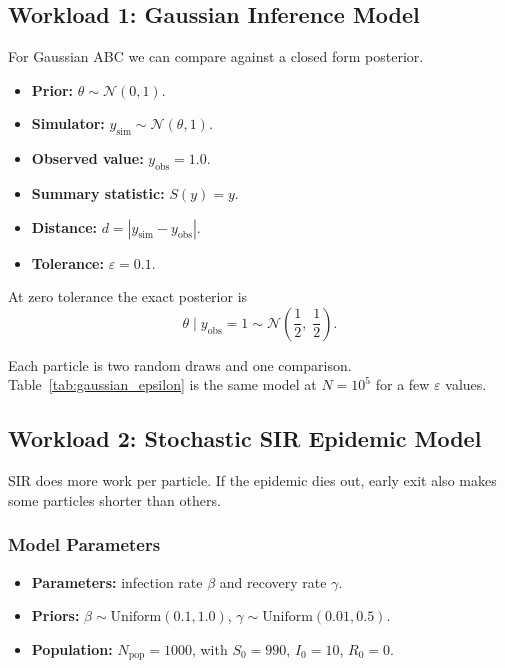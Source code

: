 \documentclass[conference]{IEEEtran}
\begin{document}
\subsection{Workload 1: Gaussian Inference Model}

For Gaussian ABC we can compare against a closed form posterior.

\begin{itemize}
    \item \textbf{Prior:} $\theta \sim \mathcal{N}(0, 1)$.
    \item \textbf{Simulator:} $y_{\mathrm{sim}} \sim \mathcal{N}(\theta, 1)$.
    \item \textbf{Observed value:} $y_{\mathrm{obs}} = 1.0$.
    \item \textbf{Summary statistic:} $S(y) = y$.
    \item \textbf{Distance:}
          $d = |y_{\mathrm{sim}} - y_{\mathrm{obs}}|$.
    \item \textbf{Tolerance:} $\varepsilon = 0.1$.
\end{itemize}

At zero tolerance the exact posterior is
\begin{equation}
    \theta \mid y_{\mathrm{obs}} = 1 \sim
    \mathcal{N}\!\left(\frac{1}{2},\; \frac{1}{2}\right).
    \label{eq:gaussian_posterior}
\end{equation}

Each particle is two random draws and one comparison. Table~\ref{tab:gaussian_epsilon}
is the same model at $N=10^5$ for a few $\varepsilon$ values.

\subsection{Workload 2: Stochastic SIR Epidemic Model}

SIR does more work per particle. If the epidemic dies out, early exit also
makes some particles shorter than others.

\subsubsection{Model Parameters}

\begin{itemize}
    \item \textbf{Parameters:} infection rate $\beta$ and recovery rate $\gamma$.
    \item \textbf{Priors:} $\beta \sim \mathrm{Uniform}(0.1, 1.0)$,\;
          $\gamma \sim \mathrm{Uniform}(0.01, 0.5)$.
    \item \textbf{Population:} $N_{\mathrm{pop}} = 1000$, with
          $S_0 = 990$, $I_0 = 10$, $R_0 = 0$.
\end{itemize}
\end{document}
